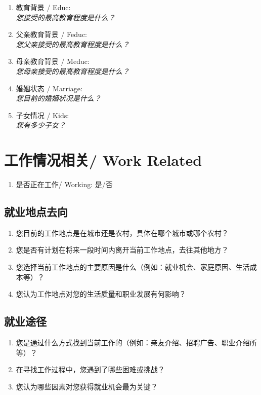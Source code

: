 \documentclass[12pt]{article}
\begin{document}
\begin{enumerate}
    \item 教育背景 / Educ: \\
    \textit{您接受的最高教育程度是什么？}
    \item 父亲教育背景 / Feduc: \\
    \textit{您父亲接受的最高教育程度是什么？}
    \item 母亲教育背景 / Meduc: \\
    \textit{您母亲接受的最高教育程度是什么？}
    \item 婚姻状态 / Marriage: \\
    \textit{您目前的婚姻状况是什么？}
    \item 子女情况 / Kids: \\
    \textit{您有多少子女？}
\end{enumerate}
\section{工作情况相关/ Work Related}
\begin{enumerate}
    \item 是否正在工作/ Working: 是/否

\end{enumerate}

\subsection*{就业地点去向}
\begin{enumerate}
    \item 您目前的工作地点是在城市还是农村，具体在哪个城市或哪个农村？
    \item 您是否有计划在将来一段时间内离开当前工作地点，去往其他地方？
    \item 您选择当前工作地点的主要原因是什么（例如：就业机会、家庭原因、生活成本等）？
    \item 您认为工作地点对您的生活质量和职业发展有何影响？
\end{enumerate}

\subsection*{就业途径}
\begin{enumerate}
    \item 您是通过什么方式找到当前工作的（例如：亲友介绍、招聘广告、职业介绍所等）？
    \item 在寻找工作过程中，您遇到了哪些困难或挑战？
    \item 您认为哪些因素对您获得就业机会最为关键？
\end{enumerate}
\end{document}
